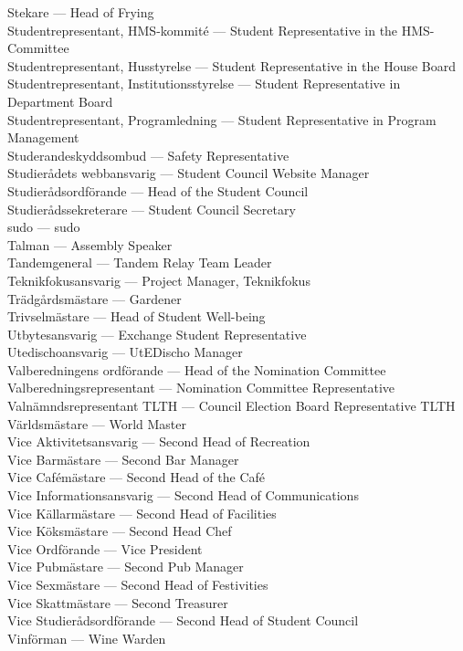 \documentclass{dsekkallelse}
\begin{document}
Stekare ---	Head of Frying\\
Studentrepresentant, HMS-kommité ---	Student Representative in the HMS-Committee\\
Studentrepresentant, Husstyrelse ---	Student Representative in the House Board\\
Studentrepresentant, Institutionsstyrelse ---	Student Representative in Department Board\\
Studentrepresentant, Programledning ---	Student Representative in Program Management\\
Studerandeskyddsombud ---	Safety Representative\\
Studierådets webbansvarig ---	Student Council Website Manager\\
Studierådsordförande ---	Head of the Student Council\\
Studierådssekreterare ---	Student Council Secretary\\
sudo ---	sudo\\
Talman ---	Assembly Speaker\\
Tandemgeneral ---	Tandem Relay Team Leader\\
Teknikfokusansvarig ---	Project Manager, Teknikfokus\\
Trädgårdsmästare ---	Gardener\\
Trivselmästare ---	Head of Student Well-being\\
Utbytesansvarig ---	Exchange Student Representative\\
Utedischoansvarig ---	UtEDischo Manager\\
Valberedningens ordförande ---	Head of the Nomination Committee\\
Valberedningsrepresentant ---	Nomination Committee Representative\\
Valnämndsrepresentant TLTH ---	Council Election Board Representative TLTH\\
Världsmästare ---	World Master\\
Vice Aktivitetsansvarig --- Second Head of Recreation\\
Vice Barmästare ---	Second Bar Manager\\
Vice Cafémästare ---	Second Head of the Café\\
Vice Informationsansvarig ---	Second Head of Communications\\
Vice Källarmästare ---	Second Head of Facilities\\
Vice Köksmästare ---	Second Head Chef\\
Vice Ordförande ---	Vice President\\
Vice Pubmästare ---	Second Pub Manager\\
Vice Sexmästare ---	Second Head of Festivities\\
Vice Skattmästare ---	Second Treasurer\\
Vice Studierådsordförande ---	Second Head of Student Council\\
Vinförman ---	Wine Warden\\
\end{document}
